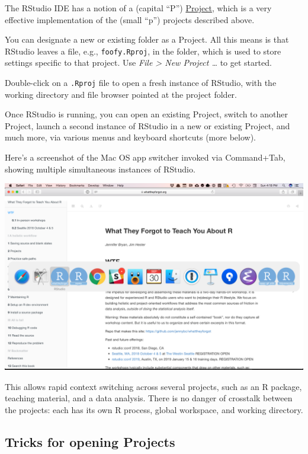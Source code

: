 \documentclass[
  letterpaper,
]{book}
\begin{document}
The RStudio IDE has a notion of a (capital ``P'')
\href{https://support.rstudio.com/hc/en-us/articles/200526207-Using-Projects}{Project},
which is a very effective implementation of the (small ``p'') projects
described above.

You can designate a new or existing folder as a Project. All this means
is that RStudio leaves a file, e.g., \texttt{foofy.Rproj}, in the
folder, which is used to store settings specific to that project. Use
\emph{File \textgreater{} New Project \ldots{}} to get started.

Double-click on a \texttt{.Rproj} file to open a fresh instance of
RStudio, with the working directory and file browser pointed at the
project folder.

Once RStudio is running, you can open an existing Project, switch to
another Project, launch a second instance of RStudio in a new or
existing Project, and much more, via various menus and keyboard
shortcuts (more below).

Here's a screenshot of the Mac OS app switcher invoked via Command+Tab,
showing multiple simultaneous instances of RStudio.

\includegraphics[width=1\textwidth,height=\textheight]{./img/multiple-rstudio-projects.png}

This allows rapid context switching across several projects, such as an
R package, teaching material, and a data analysis. There is no danger of
crosstalk between the projects: each has its own R process, global
workspace, and working directory.

\hypertarget{tricks-for-opening-projects}{%
\subsection{Tricks for opening
Projects}\label{tricks-for-opening-projects}}
\end{document}
